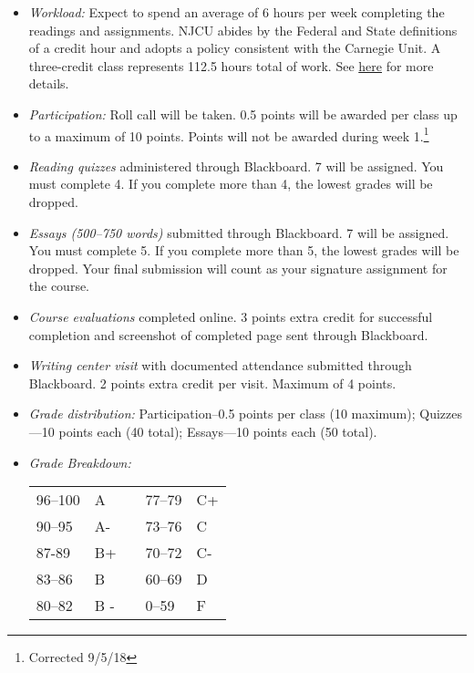 \documentclass[article,oneside]{memoir}
\begin{document}
\begin{itemize}
\item \textit{Workload:} Expect to spend an average of 6 hours per week completing the readings and assignments. NJCU abides by the Federal and State definitions of a credit hour and adopts a policy consistent with the Carnegie Unit. A three-credit class represents 112.5 hours total of work. See \href{http://scottoconnor.org/resources/Credit.pdf}{here} for more details.

\item \textit{Participation:} Roll call will be taken. 0.5 points will be awarded per class up to a maximum of 10 points. Points will not be awarded during week 1.\footnote{Corrected 9/5/18} 

\item \textit{Reading quizzes} administered through Blackboard. 7 will be assigned. You must complete 4. If you complete more than 4, the lowest grades will be dropped. 


\item \textit{Essays (500--750 words)} submitted through Blackboard.  7 will be assigned. You must complete 5. If you complete more than 5, the lowest grades will be dropped. Your final submission will count as your signature assignment for the course. 

\item \textit{Course evaluations} completed online. 3 points extra credit for successful completion  and screenshot of completed page sent through Blackboard. 

\item \textit{Writing center visit} with documented attendance submitted through Blackboard. 2 points extra credit per visit. Maximum of 4 points.  
  
\item \textit{Grade distribution:} Participation--0.5 points per class (10 maximum); Quizzes---10 points each (40 total);  Essays---10 points each (50 total).


\item \textit{Grade Breakdown:}

 \begin{tabular}{ | l | l | p{2cm} | l | l | }
    \hline 
96--100 & A  & &  77--79 &  C+ \\  
90--95 & A- & &  73--76 & C \\
87-89 & B+ &  &  70--72 & C- \\ 
83--86 & B  & &  60--69 & D\\
80--82 & B - & & 0--59 & F\\ \hline
    \end{tabular}


\end{itemize}
\end{document}

